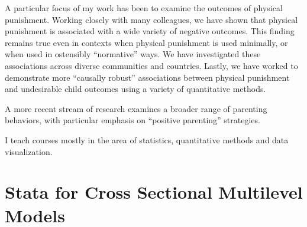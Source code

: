 \documentclass[
  letterpaper,
  DIV=11,
  numbers=noendperiod]{scrreprt}
\begin{document}
A particular focus of my work has been to examine the outcomes of
physical punishment. Working closely with many colleagues, we have shown
that physical punishment is associated with a wide variety of negative
outcomes. This finding remains true even in contexts when physical
punishment is used minimally, or when used in ostensibly ``normative''
ways. We have investigated these associations across diverse communities
and countries. Lastly, we have worked to demonstrate more ``causally
robust'' associations between physical punishment and undesirable child
outcomes using a variety of quantitative methods.

A more recent stream of research examines a broader range of parenting
behaviors, with particular emphasis on ``positive parenting''
strategies.

I teach courses mostly in the area of statistics, quantitative methods
and data visualization.

\appendix
{}

\hypertarget{stata-for-cross-sectional-multilevel-models}{%
\chapter{Stata for Cross Sectional Multilevel
Models}\label{stata-for-cross-sectional-multilevel-models}}
\end{document}

